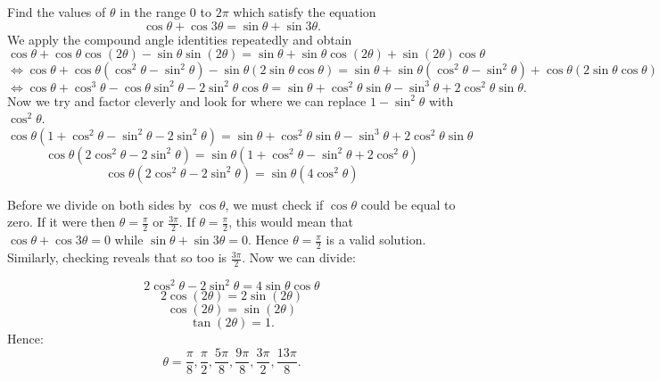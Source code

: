 Find the values of $\theta$ in the range $0$ to $2\pi$ which satisfy the equation
\[
\cos \theta + \cos 3\theta = \sin \theta + \sin 3\theta.
\]
We apply the compound angle identities repeatedly and obtain
\[
\cos \theta + \cos\theta\cos(2\theta) -\sin\theta\sin(2\theta) = \sin\theta + \sin\theta\cos(2\theta) + \sin(2\theta)\cos\theta
\]
\[
\iff \cos\theta + \cos\theta(\cos^2\theta-\sin^2\theta) -\sin\theta(2\sin\theta\cos\theta) = \sin\theta + \sin\theta(\cos^2\theta-\sin^2\theta) + \cos\theta(2\sin\theta\cos\theta)
\]
\[
\iff \cos \theta + \cos^3\theta -\cos\theta\sin^2\theta -2\sin^2\theta\cos\theta = \sin\theta + \cos^2\theta\sin\theta -\sin^3\theta + 2\cos^2\theta\sin\theta.
\]
Now we try and factor cleverly and look for where we can replace $1-\sin^2\theta$ with $\cos^2\theta$.
\[
\cos \theta(1 + \cos^2 \theta - \sin^2\theta -2\sin^2\theta) = \sin\theta + \cos^2\theta\sin\theta - \sin^3\theta + 2\cos^2\theta\sin\theta
\]
\[
\cos \theta(2\cos^2\theta-2\sin^2\theta) = \sin\theta(1 + \cos^2\theta - \sin^2\theta +2\cos^2\theta)
\]
\[
\cos \theta(2\cos^2\theta-2\sin^2\theta) = \sin\theta(4\cos^2\theta)
\]

Before we divide on both sides by $\cos \theta$, we must check if $\cos \theta$ could be equal to zero. If it were then $\theta = \frac{\pi}{2}$ or $\frac{3\pi}{2}$. If $\theta = \frac{\pi}{2}$, this would mean that $\cos\theta + \cos 3\theta = 0$ while $\sin\theta + \sin3\theta = 0$. Hence $\theta = \frac{\pi}{2}$ is a valid solution. Similarly, checking reveals that so too is $\frac{3\pi}{2}$. Now we can divide:

\[
2\cos^2\theta - 2\sin^2\theta = 4\sin\theta\cos\theta
\]
\[
2\cos(2\theta) = 2\sin(2\theta)
\]
\[
\cos(2\theta) = \sin(2\theta)
\]
\[
\tan(2\theta) = 1.
\]
Hence:
\[
\theta = \frac{\pi}{8}, \frac{\pi}{2}, \frac{5\pi}{8}, \frac{9\pi}{8}, \frac{3\pi}{2}, \frac{13\pi}{8}.
\]